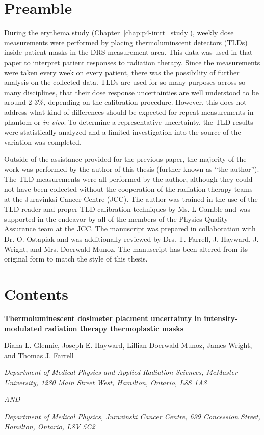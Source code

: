 \label{chap:p5-tlds}
\section*{Preamble}
During the erythema study (Chapter~\ref{chap:p4-imrt_study}), weekly dose measurements were performed by placing thermoluminscent detectors (TLDs) inside patient masks in the DRS measurement area. This data was used in that paper to interpret patient responses to radiation therapy. Since the measurements were taken every week on every patient, there was the possibility of further analysis on the collected data. TLDs are used for so many purposes across so many disciplines, that their dose response uncertainties are well understood to be around 2-3\%, depending on the calibration procedure. However, this does not address what kind of differences should be expected for repeat measurements in-phantom or \emph{in vivo}. To determine a representative uncertainty, the TLD results were statistically analyzed and a limited investigation into the source of the variation was completed.

Outside of the assistance provided for the previous paper, the majority of the work was performed by the author of this thesis (further known as ``the author''). The TLD measurements were all performed by the author, although they could not have been collected without the cooperation of the radiation therapy teams at the Juravinksi Cancer Centre (JCC). The author was trained in the use of the TLD reader and proper TLD calibration techniques by Ms. L Gamble and was supported in the endeavor by all of the members of the Physics Quality Assurance team at the JCC. The manuscript was prepared in collaboration with Dr. O. Ostapiak and was additionally reviewed by Drs. T. Farrell, J. Hayward, J. Wright, and Mrs. Doerwald-Munoz. The manuscript has been altered from its original form to match the style of this thesis.

\section*{Contents}

\begin{center}
	
	\textbf{Thermoluminescent dosimeter placment uncertainty in intensity-modulated radiation therapy thermoplastic masks}
	
	Diana L. Glennie, Joseph E. Hayward, Lillian Doerwald-Munoz, James Wright, and Thomas J. Farrell
	
	\textit{Department of Medical Physics and Applied Radiation Sciences, McMaster University, 1280 Main Street West, Hamilton, Ontario, L8S 1A8}
	
	\textit{AND}
	
	\textit{Department of Medical Physics, Juravinski Cancer Centre, 699 Concession Street, Hamilton, Ontario, L8V 5C2}
	
\end{center}

